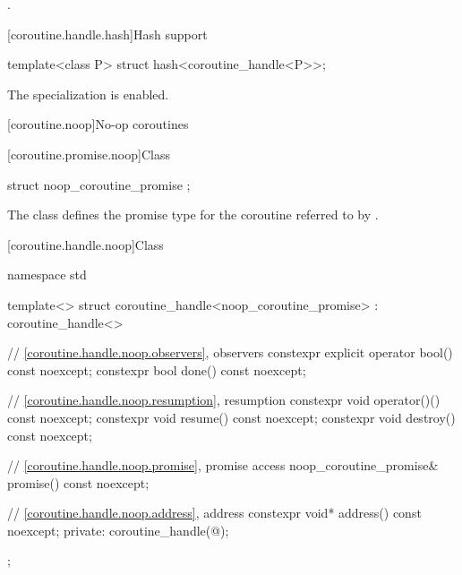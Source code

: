\begin{itemdescr}
\pnum \returns {}.
\end{itemdescr}

[coroutine.handle.hash]{Hash support}

%
\begin{itemdecl}
template<class P> struct hash<coroutine_handle<P>>;
\end{itemdecl}

\begin{itemdescr}
\pnum The specialization is enabled.
\end{itemdescr}

[coroutine.noop]{No-op coroutines}

[coroutine.promise.noop]{Class }

%
\begin{itemdecl}
struct noop_coroutine_promise {};
\end{itemdecl}

\begin{itemdescr}
\pnum The class  defines the promise type for
the coroutine referred to
by .
\end{itemdescr}

[coroutine.handle.noop]{Class }

%
\begin{codeblock}
namespace std {
  template<>
  struct coroutine_handle<noop_coroutine_promise> : coroutine_handle<>
  {
    // \ref{coroutine.handle.noop.observers}, observers
    constexpr explicit operator bool() const noexcept;
    constexpr bool done() const noexcept;

    // \ref{coroutine.handle.noop.resumption}, resumption
    constexpr void operator()() const noexcept;
    constexpr void resume() const noexcept;
    constexpr void destroy() const noexcept;

    // \ref{coroutine.handle.noop.promise}, promise access
    noop_coroutine_promise& promise() const noexcept;

    // \ref{coroutine.handle.noop.address}, address
    constexpr void* address() const noexcept;
  private:
    coroutine_handle(@\unspec@);
  };
}
\end{codeblock}

